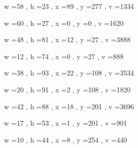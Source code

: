 \documentclass[11pt]{article}
\begin{document}
\par
w =58 , h =23 , x =89 , y =277 , v =1334
\par
w =60 , h =27 , x =0 , y =0 , v =1620
\par
w =48 , h =81 , x =12 , y =27 , v =3888
\par
w =12 , h =74 , x =0 , y =27 , v =888
\par
w =38 , h =93 , x =22 , y =108 , v =3534
\par
w =20 , h =91 , x =2 , y =108 , v =1820
\par
w =42 , h =88 , x =18 , y =201 , v =3696
\par
w =17 , h =53 , x =1 , y =201 , v =901
\par
w =10 , h =44 , x =8 , y =254 , v =440
\par
\newpage
\end{document}
